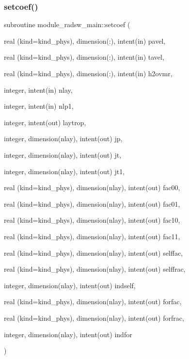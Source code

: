 \subsubsection{\texorpdfstring{setcoef()}{setcoef()}}
{\footnotesize\ttfamily subroutine module\+\_\+radsw\+\_\+main\+::setcoef (\begin{DoxyParamCaption}\item[{real (kind=kind\+\_\+phys), dimension(\+:), intent(in)}]{pavel,  }\item[{real (kind=kind\+\_\+phys), dimension(\+:), intent(in)}]{tavel,  }\item[{real (kind=kind\+\_\+phys), dimension(\+:), intent(in)}]{h2ovmr,  }\item[{integer, intent(in)}]{nlay,  }\item[{integer, intent(in)}]{nlp1,  }\item[{integer, intent(out)}]{laytrop,  }\item[{integer, dimension(nlay), intent(out)}]{jp,  }\item[{integer, dimension(nlay), intent(out)}]{jt,  }\item[{integer, dimension(nlay), intent(out)}]{jt1,  }\item[{real (kind=kind\+\_\+phys), dimension(nlay), intent(out)}]{fac00,  }\item[{real (kind=kind\+\_\+phys), dimension(nlay), intent(out)}]{fac01,  }\item[{real (kind=kind\+\_\+phys), dimension(nlay), intent(out)}]{fac10,  }\item[{real (kind=kind\+\_\+phys), dimension(nlay), intent(out)}]{fac11,  }\item[{real (kind=kind\+\_\+phys), dimension(nlay), intent(out)}]{selffac,  }\item[{real (kind=kind\+\_\+phys), dimension(nlay), intent(out)}]{selffrac,  }\item[{integer, dimension(nlay), intent(out)}]{indself,  }\item[{real (kind=kind\+\_\+phys), dimension(nlay), intent(out)}]{forfac,  }\item[{real (kind=kind\+\_\+phys), dimension(nlay), intent(out)}]{forfrac,  }\item[{integer, dimension(nlay), intent(out)}]{indfor }\end{DoxyParamCaption})\hspace{0.3cm}{\ttfamily [private]}}


